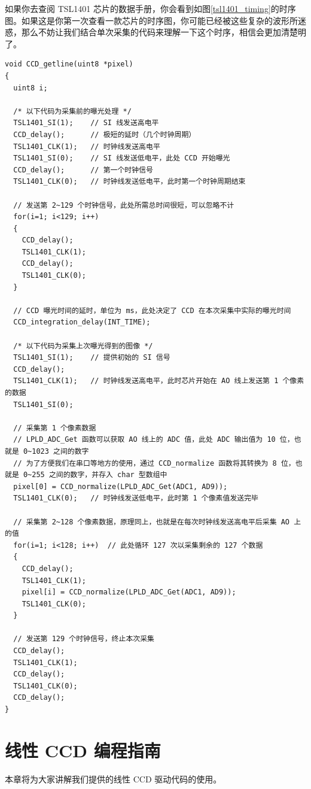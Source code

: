 如果你去查阅 TSL1401 芯片的数据手册，你会看到如图\ref{tsl1401_timing}的时序图。如果这是你第一次查看一款芯片的时序图，你可能已经被这些复杂的波形所迷惑，那么不妨让我们结合单次采集的代码来理解一下这个时序，相信会更加清楚明了。

\begin{verbatim}
void CCD_getline(uint8 *pixel)
{
  uint8 i;

  /* 以下代码为采集前的曝光处理 */
  TSL1401_SI(1);    // SI 线发送高电平
  CCD_delay();      // 极短的延时（几个时钟周期）
  TSL1401_CLK(1);   // 时钟线发送高电平
  TSL1401_SI(0);    // SI 线发送低电平，此处 CCD 开始曝光
  CCD_delay();      // 第一个时钟信号
  TSL1401_CLK(0);   // 时钟线发送低电平，此时第一个时钟周期结束

  // 发送第 2~129 个时钟信号，此处所需总时间很短，可以忽略不计
  for(i=1; i<129; i++)
  {
    CCD_delay();
    TSL1401_CLK(1);
    CCD_delay();
    TSL1401_CLK(0);
  }

  // CCD 曝光时间的延时，单位为 ms，此处决定了 CCD 在本次采集中实际的曝光时间
  CCD_integration_delay(INT_TIME);

  /* 以下代码为采集上次曝光得到的图像 */
  TSL1401_SI(1);    // 提供初始的 SI 信号
  CCD_delay();
  TSL1401_CLK(1);   // 时钟线发送高电平，此时芯片开始在 AO 线上发送第 1 个像素的数据
  TSL1401_SI(0);

  // 采集第 1 个像素数据
  // LPLD_ADC_Get 函数可以获取 AO 线上的 ADC 值，此处 ADC 输出值为 10 位，也就是 0~1023 之间的数字
  // 为了方便我们在串口等地方的使用，通过 CCD_normalize 函数将其转换为 8 位，也就是 0~255 之间的数字，并存入 char 型数组中
  pixel[0] = CCD_normalize(LPLD_ADC_Get(ADC1, AD9));
  TSL1401_CLK(0);   // 时钟线发送低电平，此时第 1 个像素值发送完毕

  // 采集第 2~128 个像素数据，原理同上，也就是在每次时钟线发送高电平后采集 AO 上的值
  for(i=1; i<128; i++)  // 此处循环 127 次以采集剩余的 127 个数据
  {
    CCD_delay();
    TSL1401_CLK(1);
    pixel[i] = CCD_normalize(LPLD_ADC_Get(ADC1, AD9));
    TSL1401_CLK(0);
  }

  // 发送第 129 个时钟信号，终止本次采集
  CCD_delay();
  TSL1401_CLK(1);
  CCD_delay();
  TSL1401_CLK(0);
  CCD_delay();
}
\end{verbatim}

\section{线性 CCD 编程指南}
本章将为大家讲解我们提供的线性 CCD 驱动代码的使用。

